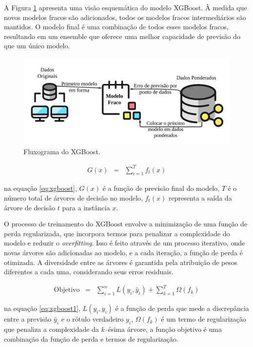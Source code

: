 A Figura \ref{fig:xgboos} apresenta uma visão esquemática do modelo XGBoost. À medida que novos modelos fracos são adicionados, todos os modelos fracos intermediários são mantidos. O modelo final é uma combinação de todos esses modelos fracos, resultando em um ensemble que oferece uma melhor capacidade de previsão do que um único modelo.

\begin{figure}[!htb]
	\centering
	\caption{Fluxograma do XGBoost.}
	\label{fig:xgboos}
	\includegraphics[width=\linewidth]{Modelos/Figuras/xgboos.pdf}
\end{figure}
 

 \begin{eqnarray}
 	 G(x) &=& \sum_{i=1}^{T} f_t(x) \label{eq:xgboost}
 \end{eqnarray}

 
\noindent na equação \eqref{eq:xgboost}, $G(x)$ é a função de previsão final do modelo,  $T$ é o número total de árvores de decisão no modelo, $f_t(x)$  representa a saída da árvore de decisão $ t $ para a instância $ x $.
 
 O processo de treinamento do XGBoost envolve a minimização de uma função de perda regularizada, que incorpora termos para penalizar a complexidade do modelo e reduzir o \textit{overfitting}. Isso é feito através de um processo iterativo, onde novas árvores são adicionadas ao modelo, e a cada iteração, a função de perda é otimizada. A diversidade entre as árvores é garantida pela atribuição de pesos diferentes a cada uma, considerando seus erros residuais.
 

\begin{eqnarray}
	 \text{Objetivo} &=& \sum_{i=1}^{n} L(y_i, \hat{y}_i) + \sum_{k=1}^{T} \Omega(f_k) \label{eq:xgboost1}
\end{eqnarray}

 
 \noindent na equação \eqref{eq:xgboost1}, $ L(y_i, \hat{y}_i) $ é a função de perda que mede a discrepância entre a previsão $ \hat{y}_i $ e o rótulo verdadeiro $ y_i $, $ \Omega(f_k) $ é um termo de regularização que penaliza a complexidade da $ k $--ésima árvore, a função objetivo é uma combinação da função de perda e termos de regularização.
 
